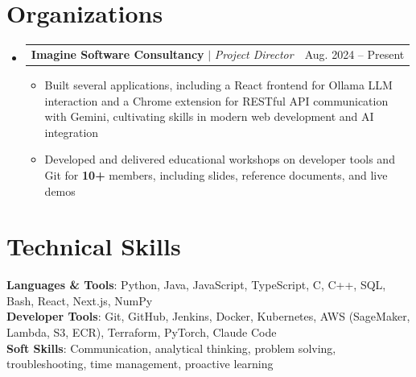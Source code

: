 \documentclass[letterpaper,11pt]{article}
\makeatletter
\newcommand{\resumeItem}[1]{
  \item\small{
    {#1 \vspace{-4pt}}
  }
}
\newcommand{\resumeProjectHeading}[2]{
    \item
    \begin{tabular*}{0.97\textwidth}{l@{\extracolsep{\fill}}r}
      \small#1 & #2 \\
    \end{tabular*}\vspace{-7pt}
}
\newcommand{\resumeSubHeadingListStart}{\begin{itemize}[leftmargin=0.15in, label={}]}
\newcommand{\resumeSubHeadingListEnd}{\end{itemize}}
\newcommand{\resumeItemListStart}{\begin{itemize}}
\newcommand{\resumeItemListEnd}{\end{itemize}\vspace{-5pt}}
\makeatother
\begin{document}
\section{Organizations}
  \resumeSubHeadingListStart

    \resumeProjectHeading
      {\textbf{Imagine Software Consultancy} $|$ \emph{Project Director}}{Aug. 2024 -- Present}
      \resumeItemListStart
        \resumeItem{Built several applications, including a React frontend for Ollama LLM interaction and a Chrome extension for RESTful API communication with Gemini, cultivating skills in modern web development and AI integration}
        \resumeItem{Developed and delivered educational workshops on developer tools and Git for \textbf{10+} members, including slides, reference documents, and live demos}
      \resumeItemListEnd

 \resumeSubHeadingListEnd
 
%
\section{Technical Skills}
 \begin{itemize}[leftmargin=0.15in, label={}]
    \small{\item{
     \textbf{Languages \& Tools}{: Python, Java, JavaScript, TypeScript, C, C++, SQL, Bash, React, Next.js, NumPy} \\
     \textbf{Developer Tools}{: Git, GitHub, Jenkins, Docker, Kubernetes, AWS (SageMaker, Lambda, S3, ECR), Terraform, PyTorch, Claude Code} \\
     \textbf{Soft Skills}{: Communication, analytical thinking, problem solving, troubleshooting, time management, proactive learning} \\
    }}
 \end{itemize}


\end{document}
